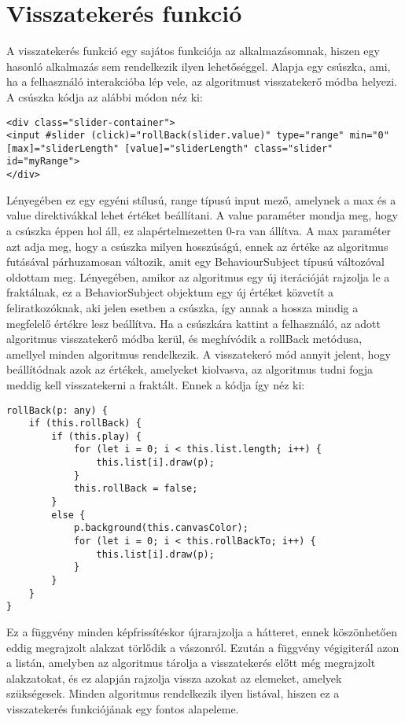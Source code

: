 \section*{Visszatekerés funkció}
A visszatekerés funkció egy sajátos funkciója az alkalmazásomnak, hiszen egy hasonló alkalmazás sem rendelkezik ilyen lehetőséggel. Alapja egy csúszka, ami, ha a felhasználó interakcióba lép vele, az algoritmust visszatekerő módba helyezi. A csúszka kódja az alábbi módon néz ki:
\begin{lstlisting}
<div class="slider-container">
<input #slider (click)="rollBack(slider.value)" type="range" min="0" [max]="sliderLength" [value]="sliderLength" class="slider" id="myRange">
</div>
\end{lstlisting}
Lényegében ez egy egyéni stílusú, range típusú input mező, amelynek a max és a value direktivákkal lehet értéket beállítani. A value paraméter mondja meg, hogy a csúszka éppen hol áll, ez alapértelmezetten 0-ra van állítva. A max paraméter azt adja meg, hogy a csúszka milyen hosszúságú, ennek az értéke az algoritmus futásával párhuzamosan változik, amit egy BehaviourSubject típusú változóval oldottam meg. Lényegében, amikor az algoritmus egy új iterációját rajzolja le a fraktálnak, ez a BehaviorSubject objektum egy új értéket közvetít a feliratkozóknak, aki jelen esetben a csúszka, így annak a hossza mindig a megfelelő értékre lesz beállítva. Ha a csúszkára kattint a felhasználó, az adott algoritmus visszatekerő módba kerül, és meghívódik a rollBack metódusa, amellyel minden algoritmus rendelkezik. A visszatekeró mód annyit jelent, hogy beállítódnak azok az értékek, amelyeket kiolvasva, az algoritmus tudni fogja meddig kell visszatekerni a fraktált. Ennek a kódja így néz ki:
\begin{lstlisting}
rollBack(p: any) {
	if (this.rollBack) {
		if (this.play) {
			for (let i = 0; i < this.list.length; i++) {
				this.list[i].draw(p);
			}
			this.rollBack = false;
		}
		else {
			p.background(this.canvasColor);
			for (let i = 0; i < this.rollBackTo; i++) {
				this.list[i].draw(p);
			}
		}
	}
}
\end{lstlisting}
Ez a függvény minden képfrissítéskor újrarajzolja a hátteret, ennek köszönhetően eddig megrajzolt alakzat törlődik a vászonról. Ezután a függvény végigiterál azon a listán, amelyben az algoritmus tárolja a visszatekerés előtt még megrajzolt alakzatokat, és ez alapján rajzolja vissza azokat az elemeket, amelyek szükségesek. Minden algoritmus rendelkezik ilyen listával, hiszen ez a visszatekerés funkciójának egy fontos alapeleme.
